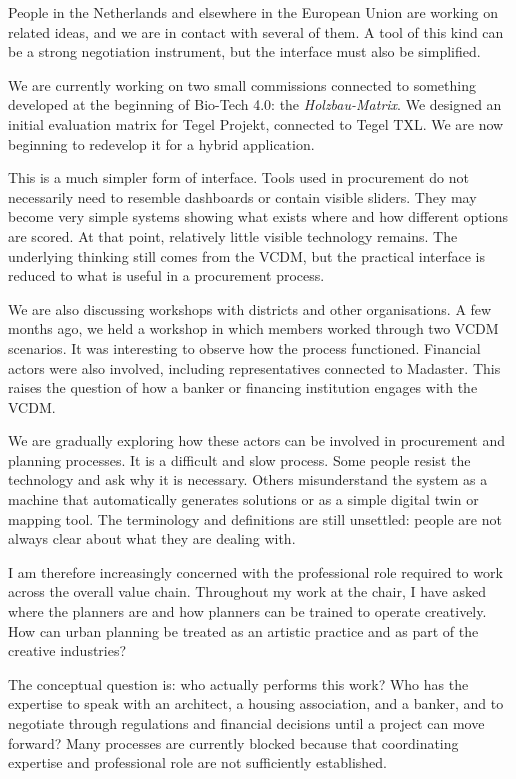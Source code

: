 People in the Netherlands and elsewhere in the European Union are working on related ideas, and we are in contact with several of them. A tool of this kind can be a strong negotiation instrument, but the interface must also be simplified.

We are currently working on two small commissions connected to something developed at the beginning of Bio-Tech 4.0: the \textit{Holzbau-Matrix}. We designed an initial evaluation matrix for Tegel Projekt, connected to Tegel TXL. We are now beginning to redevelop it for a hybrid application.

This is a much simpler form of interface. Tools used in procurement do not necessarily need to resemble dashboards or contain visible sliders. They may become very simple systems showing what exists where and how different options are scored. At that point, relatively little visible technology remains. The underlying thinking still comes from the VCDM, but the practical interface is reduced to what is useful in a procurement process.

We are also discussing workshops with districts and other organisations. A few months ago, we held a workshop in which members worked through two VCDM scenarios. It was interesting to observe how the process functioned. Financial actors were also involved, including representatives connected to Madaster. This raises the question of how a banker or financing institution engages with the VCDM.

We are gradually exploring how these actors can be involved in procurement and planning processes. It is a difficult and slow process. Some people resist the technology and ask why it is necessary. Others misunderstand the system as a machine that automatically generates solutions or as a simple digital twin or mapping tool. The terminology and definitions are still unsettled: people are not always clear about what they are dealing with.

I am therefore increasingly concerned with the professional role required to work across the overall value chain. Throughout my work at the chair, I have asked where the planners are and how planners can be trained to operate creatively. How can urban planning be treated as an artistic practice and as part of the creative industries?

The conceptual question is: who actually performs this work? Who has the expertise to speak with an architect, a housing association, and a banker, and to negotiate through regulations and financial decisions until a project can move forward? Many processes are currently blocked because that coordinating expertise and professional role are not sufficiently established.

